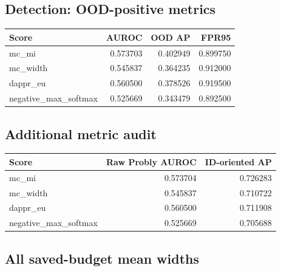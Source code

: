 \reservetable
\subsection{Detection: OOD-positive metrics}

\begingroup\small
\setlength{\tabcolsep}{4pt}
\begin{longtable}{lrrr}
\toprule

Score & AUROC & OOD AP & FPR95\\\midrule\endhead

mc\_mi & 0.573703 & 0.402949 & 0.899750\\

mc\_width & 0.545837 & 0.364235 & 0.912000\\

dappr\_eu & 0.560500 & 0.378526 & 0.919500\\

negative\_max\_softmax & 0.525669 & 0.343479 & 0.892500\\

\bottomrule
\end{longtable}
\endgroup

\reservetable
\subsection{Additional metric audit}

\begingroup\small
\setlength{\tabcolsep}{4pt}
\begin{longtable}{lrr}
\toprule

Score & Raw Probly AUROC & ID-oriented AP\\\midrule\endhead

mc\_mi & 0.573704 & 0.726283\\

mc\_width & 0.545837 & 0.710722\\

dappr\_eu & 0.560500 & 0.711908\\

negative\_max\_softmax & 0.525669 & 0.705688\\

\bottomrule
\end{longtable}
\endgroup

\reservetable
\subsection{All saved-budget mean widths}

